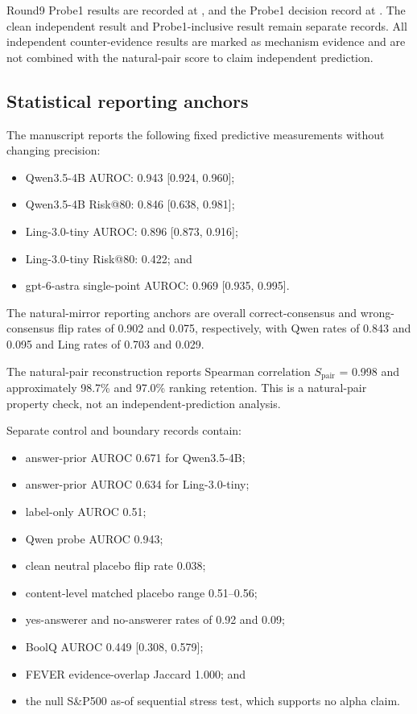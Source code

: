 \documentclass[11pt]{article}
\begin{document}
Round9 Probe1 results are recorded at , and the Probe1 decision record at . The clean independent result and Probe1-inclusive result remain separate records. All independent counter-evidence results are marked as mechanism evidence and are not combined with the natural-pair score to claim independent prediction.

\subsection{Statistical reporting anchors}

The manuscript reports the following fixed predictive measurements without changing precision:

\begin{itemize}
  \item Qwen3.5-4B AUROC: 0.943 [0.924, 0.960];
  \item Qwen3.5-4B Risk@80: 0.846 [0.638, 0.981];
  \item Ling-3.0-tiny AUROC: 0.896 [0.873, 0.916];
  \item Ling-3.0-tiny Risk@80: 0.422; and
  \item gpt-6-astra single-point AUROC: 0.969 [0.935, 0.995].
\end{itemize}

The natural-mirror reporting anchors are overall correct-consensus and wrong-consensus flip rates of 0.902 and 0.075, respectively, with Qwen rates of 0.843 and 0.095 and Ling rates of 0.703 and 0.029.

The natural-pair reconstruction reports Spearman correlation \(S_{\text{pair}}\) = 0.998 and approximately 98.7\% and 97.0\% ranking retention. This is a natural-pair property check, not an independent-prediction analysis.

Separate control and boundary records contain:

\begin{itemize}
  \item answer-prior AUROC 0.671 for Qwen3.5-4B;
  \item answer-prior AUROC 0.634 for Ling-3.0-tiny;
  \item label-only AUROC 0.51;
  \item Qwen probe AUROC 0.943;
  \item clean neutral placebo flip rate 0.038;
  \item content-level matched placebo range 0.51--0.56;
  \item yes-answerer and no-answerer rates of 0.92 and 0.09;
  \item BoolQ AUROC 0.449 [0.308, 0.579];
  \item FEVER evidence-overlap Jaccard 1.000; and
  \item the null S\&P500 as-of sequential stress test, which supports no alpha claim.
\end{itemize}
\end{document}
